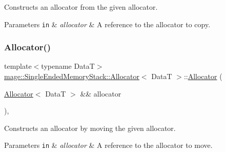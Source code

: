 Constructs an allocator from the given allocator.


\begin{DoxyParams}[1]{Parameters}
\mbox{\tt in}  & {\em allocator} & A reference to the allocator to copy. \\
\hline
\end{DoxyParams}
\hypertarget{structmage_1_1_single_ended_memory_stack_1_1_allocator_a365434b6505598a7de9aae4b323f1c16}{}\label{structmage_1_1_single_ended_memory_stack_1_1_allocator_a365434b6505598a7de9aae4b323f1c16} 
\subsubsection{\texorpdfstring{Allocator()}{Allocator()}\hspace{0.1cm}{\footnotesize\ttfamily [2/4]}}
{\footnotesize\ttfamily template$<$typename DataT$>$ \\
\hyperlink{structmage_1_1_single_ended_memory_stack_1_1_allocator}{mage\+::\+Single\+Ended\+Memory\+Stack\+::\+Allocator}$<$ DataT $>$\+::\hyperlink{structmage_1_1_single_ended_memory_stack_1_1_allocator}{Allocator} (\begin{DoxyParamCaption}\item[{\hyperlink{structmage_1_1_single_ended_memory_stack_1_1_allocator}{Allocator}$<$ DataT $>$ \&\&}]{allocator }\end{DoxyParamCaption})\hspace{0.3cm}{\ttfamily [default]}, {\ttfamily [noexcept]}}

Constructs an allocator by moving the given allocator.


\begin{DoxyParams}[1]{Parameters}
\mbox{\tt in}  & {\em allocator} & A reference to the allocator to move. \\
\hline
\end{DoxyParams}
\hypertarget{structmage_1_1_single_ended_memory_stack_1_1_allocator_ac0dc5bf3c1c3293cf081e45ed28101dc}{}\label{structmage_1_1_single_ended_memory_stack_1_1_allocator_ac0dc5bf3c1c3293cf081e45ed28101dc} 
